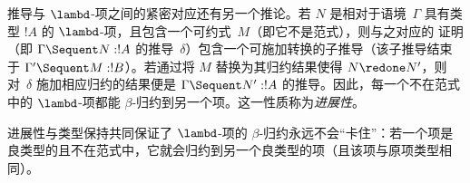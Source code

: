 \documentclass[../../../include/open-logic-section]{subfiles}
\begin{document}
推导与 $\lambd$-项之间的紧密对应还有另一个推论。若 $N$ 是相对于语境~$\Gamma$ 具有类型 $!A$ 的 $\lambd$-项，且包含一个可约式~$M$（即它不是范式），则与之对应的  证明（即 $\Gamma \Sequent N : !A$ 的推导~$\delta$）包含一个可施加转换的子推导（该子推导结束于 $\Gamma' \Sequent M: !B$）。若通过将 $M$ 替换为其归约结果使得 $N \redone N'$，则对~$\delta$ 施加相应归约的结果便是 $\Gamma \Sequent N' : !A$ 的推导。因此，每一个不在范式中的 $\lambd$-项都能 $\beta$-归约到另一个项。这一性质称为\emph{进展性}。

进展性与类型保持共同保证了 $\lambd$-项的 $\beta$-归约永远不会“卡住”：若一个项是良类型的且不在范式中，它就会归约到另一个良类型的项（且该项与原项类型相同）。
\end{document}
